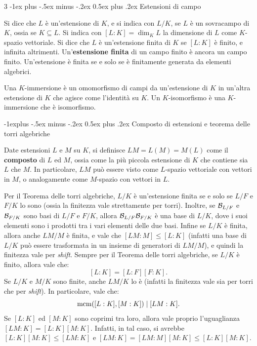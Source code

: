 \documentclass[10pt,landscape]{article}
\makeatletter
\renewcommand{\section}{\@startsection{section}{1}{0mm}%
	{-1ex plus -.5ex minus -.2ex}%
	{0.5ex plus .2ex}%
	{\normalfont\large\bfseries}}
\renewcommand{\subsection}{\@startsection{subsection}{2}{0mm}%
	{-1explus -.5ex minus -.2ex}%
	{0.5ex plus .2ex}%
	{\normalfont\normalsize\bfseries}}
\makeatother
\begin{document}
\begin{multicols}{3}
	\section{Estensioni di campo}

	Si dice che $L$ è un'estensione di $K$, e si indica
	con $L / K$, se $L$ è un sovracampo di $K$,
	ossia se $K \subseteq L$. Si indica con $[L : K] = \dim_K L$ la
	dimensione di $L$ come $K$-spazio vettoriale. Si
	dice che $L$ è un'estensione finita di $K$ se $[L : K]$
	è finito, e infinita altrimenti. Un'\textbf{estensione finita}
	di un campo finito è ancora un campo finito. Un'estensione
	è finita se e solo se è finitamente generata da elementi algebrici. \smallskip

	Una $K$-immersione è un omomorfismo di campi
	da un'estensione di $K$ in un'altra estensione di $K$ che
	agisce come l'identità su $K$. Un $K$-isomorfismo è
	una $K$-immersione che è isomorfismo.

	\subsection{Composto di estensioni e teorema delle torri algebriche}

	Date estensioni $L$ e $M$ su $K$, si definisce
	$LM = L(M) = M(L)$ come il \textbf{composto} di $L$
	ed $M$, ossia come la più piccola estensione di $K$ che
	contiene sia $L$ che $M$. In particolare, $LM$
	può essere visto come $L$-spazio vettoriale con
	vettori in $M$, o analogamente come $M$-spazio con
	vettori in $L$. \smallskip

	Per il Teorema delle torri algebriche, $L / K$ è
	un'estensione finita se e solo se $L / F$ e
	$F / K$ lo sono (ossia la finitezza vale strettamente
	per torri). Inoltre, se $\mathcal{B}_{L/F}$ e $\mathcal{B}_{F/K}$
	sono basi di $L/F$ e $F/K$, allora
	$\mathcal{B}_{L/F} \mathcal{B}_{F/K}$ è una base di
	$L / K$, dove i suoi elementi sono i prodotti tra
	i vari elementi delle due basi. Infine
	se $L / K$ è finita, allora
	anche $LM / M$ è finita, e vale che $[LM : M] \leq [L : K]$ (infatti una base di $L / K$ può essere trasformata
	in un insieme di generatori di $LM / M$), e quindi
	la finitezza vale per \textit{shift}. Sempre per
	il Teorema delle torri algebriche, se $L / K$ è
	finito, allora vale che:
	\[ [L : K] = [L : F] [F : K]. \]
	Se $L / K$ e $M / K$ sono finite, anche $LM / K$ lo
	è (infatti la finitezza vale sia per torri che per \textit{shift}). In particolare, vale che:
	\[ \operatorname{mcm}([L : K], [M : K]) \mid [LM : K]. \]
	Se $[L : K]$ ed $[M : K]$ sono coprimi tra loro,
	allora vale proprio l'uguaglianza
	$[LM : K] = [L : K] [M : K]$. Infatti, in tal caso,
	si avrebbe $[L : K] [M : K] \leq [LM : K]$ e
	$[LM : K] = [LM : M] [M : K] \leq [L : K] [M : K]$.


\end{multicols}
\end{document}
